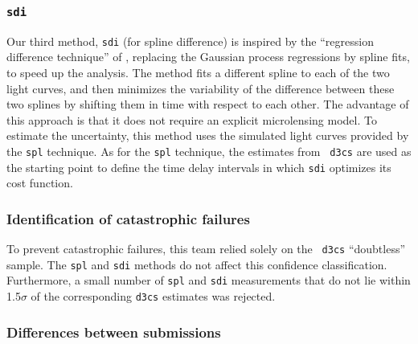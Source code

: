 \documentclass[traditabstract]{aa}
\begin{document}
\subsubsection{{\tt sdi}}

Our third method, {\tt sdi} (for spline difference) is inspired by the
``regression difference technique'' of \citet{pycs}, replacing the
Gaussian process regressions by spline fits, to speed up the
analysis. The method fits a different spline to each of the two light
curves, and then minimizes the variability of the difference between
these two splines by shifting them in time with respect to each
other. The advantage of this approach is that it does not require an
explicit microlensing model. To estimate the uncertainty, this method
uses the simulated light curves provided by the {\tt spl}
technique. As for the {\tt spl} technique, the estimates from {\tt
d3cs} are used as the starting point to define the time delay
intervals in which {\tt sdi} optimizes its cost function. 

\subsubsection{Identification of catastrophic failures}

To prevent catastrophic failures, this team relied solely on the {\tt
d3cs} ``doubtless'' sample. The {\tt spl} and {\tt sdi} methods do not
affect this confidence classification. Furthermore, a small number of
{\tt spl} and {\tt sdi} measurements that do not lie within 1.5$\sigma$
of the corresponding {\tt d3cs} estimates was rejected.

\subsubsection{Differences between submissions}
\end{document}
